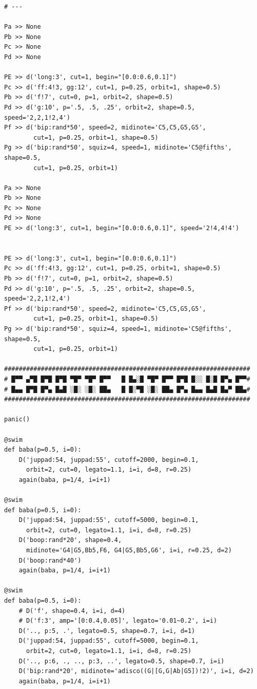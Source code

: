 \documentclass[11pt]{article}
\begin{document}
\begin{enumerate}
\begin{verbatim}
# ---

Pa >> None
Pb >> None
Pc >> None
Pd >> None

PE >> d('long:3', cut=1, begin="[0.0:0.6,0.1]")
Pc >> d('ff:4!3, gg:12', cut=1, p=0.25, orbit=1, shape=0.5)
Pb >> d('f!7', cut=0, p=1, orbit=2, shape=0.5)
Pd >> d('g:10', p='.5, .5, .25', orbit=2, shape=0.5, speed='2,2,1!2,4')
Pf >> d('bip:rand*50', speed=2, midinote='C5,C5,G5,G5',
        cut=1, p=0.25, orbit=1, shape=0.5)
Pg >> d('bip:rand*50', squiz=4, speed=1, midinote='C5@fifths', shape=0.5,
        cut=1, p=0.25, orbit=1)

Pa >> None
Pb >> None
Pc >> None
Pd >> None
PE >> d('long:3', cut=1, begin="[0.0:0.6,0.1]", speed='2!4,4!4')


PE >> d('long:3', cut=1, begin="[0.0:0.6,0.1]")
Pc >> d('ff:4!3, gg:12', cut=1, p=0.25, orbit=1, shape=0.5)
Pb >> d('f!7', cut=0, p=1, orbit=2, shape=0.5)
Pd >> d('g:10', p='.5, .5, .25', orbit=2, shape=0.5, speed='2,2,1!2,4')
Pf >> d('bip:rand*50', speed=2, midinote='C5,C5,G5,G5',
        cut=1, p=0.25, orbit=1, shape=0.5)
Pg >> d('bip:rand*50', squiz=4, speed=1, midinote='C5@fifths', shape=0.5,
        cut=1, p=0.25, orbit=1)

###################################################################
# █▀▀ ▄▀█ █▀█ █▀█ ▀█▀ ▀█▀ █▀▀   █ █▄░█ ▀█▀ █▀▀ █▀█ █░░ █░█ █▀▄ █▀▀#
# █▄▄ █▀█ █▀▄ █▄█ ░█░ ░█░ ██▄   █ █░▀█ ░█░ ██▄ █▀▄ █▄▄ █▄█ █▄▀ ██▄#
###################################################################

panic()

@swim
def baba(p=0.5, i=0):
    D('juppad:54, juppad:55', cutoff=2000, begin=0.1,
      orbit=2, cut=0, legato=1.1, i=i, d=8, r=0.25)
    again(baba, p=1/4, i=i+1)

@swim
def baba(p=0.5, i=0):
    D('juppad:54, juppad:55', cutoff=5000, begin=0.1,
      orbit=2, cut=0, legato=1.1, i=i, d=8, r=0.25)
    D('boop:rand*20', shape=0.4,
      midinote='G4|G5,Bb5,F6, G4|G5,Bb5,G6', i=i, r=0.25, d=2)
    D('boop:rand*40')
    again(baba, p=1/4, i=i+1)

@swim
def baba(p=0.5, i=0):
    # D('f', shape=0.4, i=i, d=4)
    # D('f:3', amp='[0:0.4,0.05]', legato='0.01~0.2', i=i)
    D('.., p:5, .', legato=0.5, shape=0.7, i=i, d=1)
    D('juppad:54, juppad:55', cutoff=5000, begin=0.1,
      orbit=2, cut=0, legato=1.1, i=i, d=8, r=0.25)
    D('.., p:6, ., .., p:3, ..', legato=0.5, shape=0.7, i=i)
    D('bip:rand*20', midinote='adisco((G|[G,G|Ab|G5])!2)', i=i, d=2)
    again(baba, p=1/4, i=i+1)


\end{verbatim}
\end{enumerate}
\end{document}
